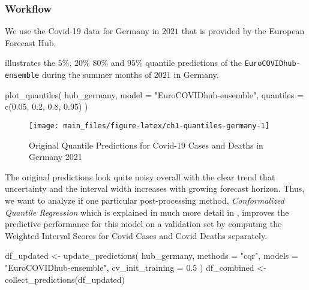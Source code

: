 \documentclass[
]{article}
\newenvironment{Shaded}{\begin{snugshade}}{\end{snugshade}}
\newcommand{\AttributeTok}[1]{\textcolor[rgb]{0.77,0.63,0.00}{#1}}
\newcommand{\FloatTok}[1]{\textcolor[rgb]{0.00,0.00,0.81}{#1}}
\newcommand{\FunctionTok}[1]{\textcolor[rgb]{0.00,0.00,0.00}{#1}}
\newcommand{\NormalTok}[1]{#1}
\newcommand{\OtherTok}[1]{\textcolor[rgb]{0.56,0.35,0.01}{#1}}
\newcommand{\StringTok}[1]{\textcolor[rgb]{0.31,0.60,0.02}{#1}}
\begin{document}
\hypertarget{workflow}{%
\subsubsection{Workflow}\label{workflow}}

We use the Covid-19 data for Germany in \(2021\) that is provided by the European Forecast Hub.

 illustrates the \(5\)\%, \(20\)\% \(80\)\% and \(95\)\% quantile predictions of the \texttt{EuroCOVIDhub-ensemble} during the summer months of \(2021\) in Germany.

\begin{Shaded}
\begin{Highlighting}[]
\FunctionTok{plot\_quantiles}\NormalTok{(}
\NormalTok{  hub\_germany,}
  \AttributeTok{model =} \StringTok{"EuroCOVIDhub{-}ensemble"}\NormalTok{, }\AttributeTok{quantiles =} \FunctionTok{c}\NormalTok{(}\FloatTok{0.05}\NormalTok{, }\FloatTok{0.2}\NormalTok{, }\FloatTok{0.8}\NormalTok{, }\FloatTok{0.95}\NormalTok{)}
\NormalTok{)}
\end{Highlighting}
\end{Shaded}

\begin{figure}

{\centering \texttt{[image: main\_files/figure-latex/ch1-quantiles-germany-1]} 

}

\caption{Original Quantile Predictions for Covid-19 Cases and Deaths in Germany 2021}\label{fig:ch1-quantiles-germany}
\end{figure}

The original predictions look quite noisy overall with the clear trend that uncertainty and the interval width increases with growing forecast horizon.
Thus, we want to analyze if one particular post-processing method, \emph{Conformalized Quantile Regression} which is explained in much more detail in , improves the predictive performance for this model on a validation set by computing the Weighted Interval Scores for Covid Cases and Covid Deaths separately.

\begin{Shaded}
\begin{Highlighting}[]
\NormalTok{df\_updated }\OtherTok{\textless{}{-}} \FunctionTok{update\_predictions}\NormalTok{(}
\NormalTok{  hub\_germany,}
  \AttributeTok{methods =} \StringTok{"cqr"}\NormalTok{, }\AttributeTok{models =} \StringTok{"EuroCOVIDhub{-}ensemble"}\NormalTok{, }\AttributeTok{cv\_init\_training =} \FloatTok{0.5}
\NormalTok{)}
\NormalTok{df\_combined }\OtherTok{\textless{}{-}} \FunctionTok{collect\_predictions}\NormalTok{(df\_updated)}
\end{Highlighting}
\end{Shaded}
\end{document}
